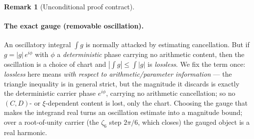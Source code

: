 \documentclass[11pt]{article}
\theoremstyle{definition}
\newtheorem{remark}[theorem]{Remark}
\begin{document}
\begin{remark}[Unconditional proof contract]
\begin{enumerate}
\paragraph{The exact gauge (removable oscillation).} An oscillatory integral $\int g$ is normally
attacked by estimating cancellation. But if $g=|g|\,e^{i\phi}$ with $\phi$ a \emph{deterministic}
phase carrying no arithmetic content, then the oscillation is a choice of chart and
$|\int g|\le\int|g|$ is \emph{lossless}. We fix the term once: \emph{lossless} here means \emph{with
respect to arithmetic/parameter information} --- the triangle inequality is in general strict, but the
magnitude it discards is exactly the deterministic carrier phase $e^{i\phi}$, carrying no arithmetic
cancellation; so no $(C,D)$- or $\xi$-dependent content is lost, only the chart. Choosing the gauge that
makes the integrand real turns an oscillation estimate into a magnitude bound; over a root-of-unity
carrier (the $\zeta_6$ step $2\pi/6$, which closes) the gauged object is a real harmonic.


\end{enumerate}
\end{remark}
\end{document}
